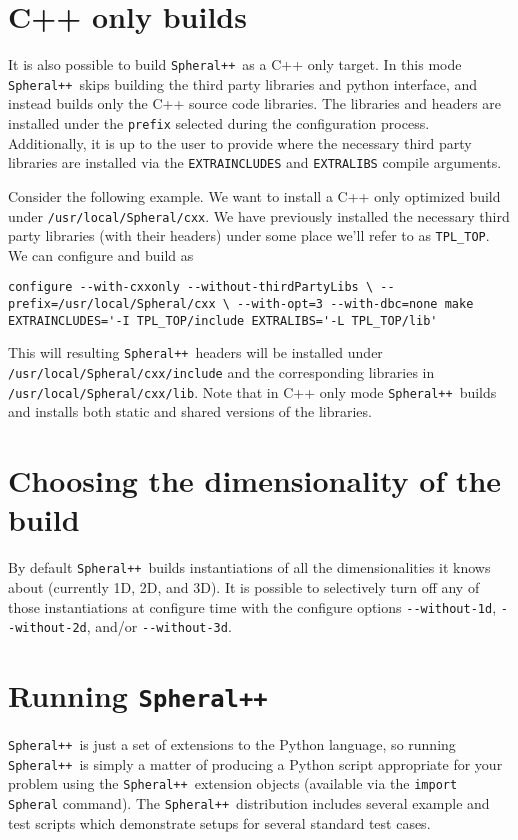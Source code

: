 \documentclass{article}
\newcommand{\Spheral}{{\tt Spheral++}}
\begin{document}
\section{C++ only builds}

It is also possible to build \Spheral\ as a C++ only target.  In this mode \Spheral\ skips building the third party libraries and python interface, and instead builds only the C++ source code libraries.  The libraries and headers are installed under the \verb.prefix. selected during the configuration process.  Additionally, it is up to the user to provide where the necessary third party libraries are installed via the \verb.EXTRAINCLUDES. and \verb.EXTRALIBS. compile arguments.

Consider the following example.  We want to install a C++ only optimized build under \verb./usr/local/Spheral/cxx..  We have previously installed the necessary third party libraries (with their headers) under some place we'll refer to as \verb.TPL_TOP..  We can configure and build as

\begin{verbatim}
configure --with-cxxonly --without-thirdPartyLibs \ --prefix=/usr/local/Spheral/cxx \ --with-opt=3 --with-dbc=none make EXTRAINCLUDES='-I TPL_TOP/include EXTRALIBS='-L TPL_TOP/lib'
\end{verbatim}

This will resulting \Spheral\ headers will be installed under \verb./usr/local/Spheral/cxx/include. and the corresponding libraries in \verb./usr/local/Spheral/cxx/lib..  Note that in C++ only mode \Spheral\ builds and installs both static and shared versions of the libraries.

\section{Choosing the dimensionality of the build}

By default \Spheral\ builds instantiations of all the dimensionalities it knows about (currently 1D, 2D, and 3D).  It is possible to selectively turn off any of those instantiations at configure time with the configure options \verb.--without-1d., \verb.--without-2d., and/or \verb.--without-3d..

\section{Running \Spheral}
\Spheral\ is just a set of extensions to the Python language, so running \Spheral\ is simply a matter of producing a Python script appropriate for your problem using the \Spheral\ extension objects (available via the \verb+import Spheral+ command).  The \Spheral\ distribution includes several example and test scripts which demonstrate setups for several standard test cases.
\end{document}
